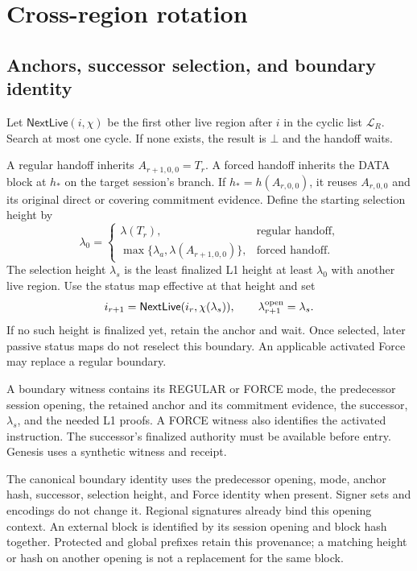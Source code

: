 \documentclass[11pt,a4paper]{article}
\newcommand{\tagg}[1]{\ensuremath{\mathsf{#1}}}
\newcounter{protocol}
\begin{document}
\section{Cross-region rotation}
\label{sec:xprotocols}

\subsection{Anchors, successor selection, and boundary identity}
\label{sec:witness}
Let $\tagg{NextLive}(i,\chi)$ be the first other live region after $i$
in the cyclic list $\mathcal L_R$. Search at most one cycle. If none
exists, the result is $\bot$ and the handoff waits.

A regular handoff inherits $A_{r+1,0,0}=T_r$. A forced handoff inherits
the DATA block at $h_*$ on the target session's branch. If
$h_*=h(A_{r,0,0})$, it reuses $A_{r,0,0}$ and its original direct or covering commitment
evidence.
Define the starting selection height by
\[
 \lambda_0=\begin{cases}
 \lambda(T_r),&\text{regular handoff},\\
 \max\{\lambda_a,\lambda(A_{r+1,0,0})\},&\text{forced handoff}.
 \end{cases}
\]
The selection height $\lambda_s$ is the least finalized L1 height at
least $\lambda_0$ with another live region. Use the status map effective
at that height and set
\[
 i_{r+1}=\tagg{NextLive}(i_r,\chi(\lambda_s)),\qquad
 \lambda^{\rm open}_{r+1}=\lambda_s.
\]
If no such height is finalized yet, retain the anchor and wait. Once
selected, later passive status maps do not reselect this boundary.
An applicable activated Force may replace a regular boundary.

A boundary witness contains its REGULAR or FORCE mode, the predecessor
session opening, the retained anchor and its commitment evidence, the successor,
$\lambda_s$, and the needed L1 proofs. A FORCE witness also identifies
the activated instruction. The successor's finalized authority must be
available before entry. Genesis uses a synthetic witness and receipt.

The canonical boundary identity uses the predecessor opening, mode,
anchor hash, successor, selection height, and Force identity when present.
Signer sets and encodings do not change it. Regional signatures already
bind this opening context. An external block is identified by its
session opening and block hash together. Protected and global prefixes
retain this provenance; a matching height or hash on another opening
is not a replacement for the same block.
\end{document}

